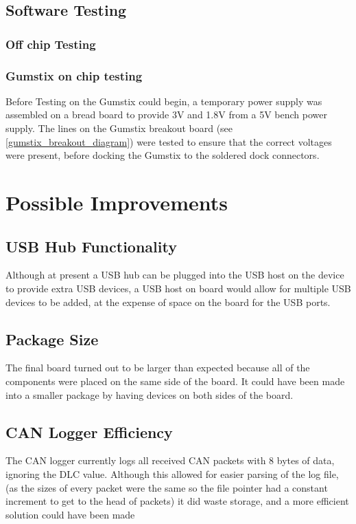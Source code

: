 \documentclass[11pt]{report} %
\begin{document}
	\section{Software Testing}
		\subsection{Off chip Testing}
		\subsection{Gumstix on chip testing}
			Before Testing on the Gumstix could begin, a temporary power supply was
			assembled on a bread board to provide 3V and 1.8V from a 5V bench
			power supply. The lines on the Gumstix breakout board (see 
			\ref{gumstix_breakout_diagram}) were tested to ensure that the correct 
			voltages were present, before docking the Gumstix to the soldered dock
			connectors. 

\chapter{Possible Improvements}
	\section{USB Hub Functionality}
	Although at present a USB hub can be plugged into the USB host on the device to
	provide extra USB devices, a USB host on board would allow for multiple USB
	devices to be added, at the expense of space on the board for the USB ports.
	
	\section{Package Size}
	The final board turned out to be larger than expected because all of the 
	components were placed on the same side of the board. It could have been made into a smaller
	package by having devices on both sides of the board. 
	
	\section{CAN Logger Efficiency}
	The CAN logger currently logs all received CAN packets with 8 bytes of data, ignoring the DLC value.
	Although this allowed for easier parsing of the log file, (as the sizes of every packet were the same
	so the file pointer had a constant increment to get to the head of packets) it did waste storage,
	and a more efficient solution could have been made
\end{document}
